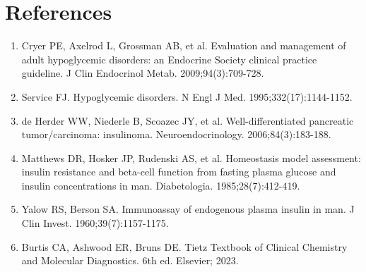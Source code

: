 \section*{References}
\begin{enumerate}
  \item Cryer PE, Axelrod L, Grossman AB, et al. Evaluation and management of adult hypoglycemic disorders: an Endocrine Society clinical practice guideline. J Clin Endocrinol Metab. 2009;94(3):709-728.
  \item Service FJ. Hypoglycemic disorders. N Engl J Med. 1995;332(17):1144-1152.
  \item de Herder WW, Niederle B, Scoazec JY, et al. Well-differentiated pancreatic tumor/carcinoma: insulinoma. Neuroendocrinology. 2006;84(3):183-188.
  \item Matthews DR, Hosker JP, Rudenski AS, et al. Homeostasis model assessment: insulin resistance and beta-cell function from fasting plasma glucose and insulin concentrations in man. Diabetologia. 1985;28(7):412-419.
  \item Yalow RS, Berson SA. Immunoassay of endogenous plasma insulin in man. J Clin Invest. 1960;39(7):1157-1175.
  \item Burtis CA, Ashwood ER, Bruns DE. Tietz Textbook of Clinical Chemistry and Molecular Diagnostics. 6th ed. Elsevier; 2023.
\end{enumerate}

\clearpage
